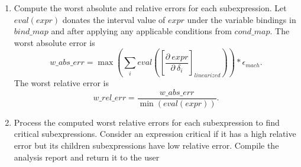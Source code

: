 \documentclass{article}
\begin{document}
\begin{enumerate}
	\item Compute the worst absolute and relative errors for each subexpression. Let $eval(expr)$ donates the interval value of $expr$ under the variable bindings in $bind\_map$ and after applying any applicable conditions from $cond\_map$. The worst absolute error is
	\[
	w\_abs\_err = \max \left(\sum_i eval\left(\left[\frac{\partial\ expr}{\partial\ \delta_i}\right]_{linearized}\right)\right) * \epsilon_{mach}.
	\]
	The worst relative error is 
	\[
	w\_rel\_err = \frac{w\_abs\_err}{\min (eval(expr))}.
	\]

	\item Process the computed worst relative errors for each subexpression to find critical subexpressions. Consider an expression critical if it has a high relative error but its children subexpressions have low relative error. Compile the analysis report and return it to the user 
\end{enumerate}
\end{document}
